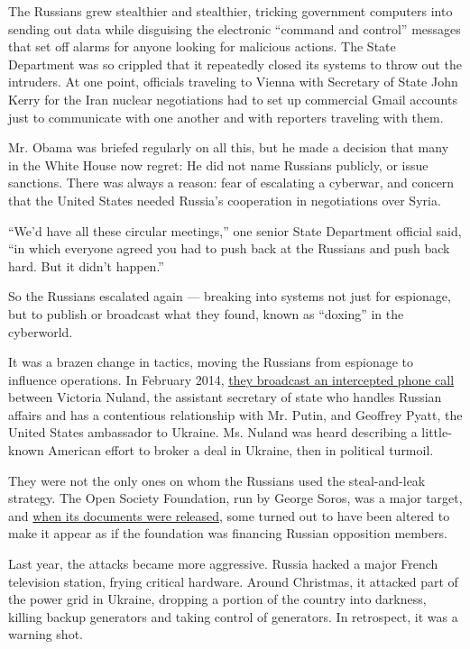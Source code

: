 The Russians grew stealthier and stealthier, tricking government
computers into sending out data while disguising the electronic
``command and control'' messages that set off alarms for anyone looking
for malicious actions. The State Department was so crippled that it
repeatedly closed its systems to throw out the intruders. At one point,
officials traveling to Vienna with Secretary of State John Kerry for the
Iran nuclear negotiations had to set up commercial Gmail accounts just
to communicate with one another and with reporters traveling with them.

Mr. Obama was briefed regularly on all this, but he made a decision that
many in the White House now regret: He did not name Russians publicly,
or issue sanctions. There was always a reason: fear of escalating a
cyberwar, and concern that the United States needed Russia's cooperation
in negotiations over Syria.

``We'd have all these circular meetings,'' one senior State Department
official said, ``in which everyone agreed you had to push back at the
Russians and push back hard. But it didn't happen.''

So the Russians escalated again --- breaking into systems not just for
espionage, but to publish or broadcast what they found, known as
``doxing'' in the cyberworld.

It was a brazen change in tactics, moving the Russians from espionage to
influence operations. In February 2014,
\href{https://www.nytimes.com/2014/02/08/world/europe/ukraine.html}{they
broadcast an intercepted phone call} between Victoria Nuland, the
assistant secretary of state who handles Russian affairs and has a
contentious relationship with Mr. Putin, and Geoffrey Pyatt, the United
States ambassador to Ukraine. Ms. Nuland was heard describing a
little-known American effort to broker a deal in Ukraine, then in
political turmoil.

They were not the only ones on whom the Russians used the steal-and-leak
strategy. The Open Society Foundation, run by George Soros, was a major
target, and \href{http://soros.dcleaks.com/}{when its documents were
released}, some turned out to have been altered to make it appear as if
the foundation was financing Russian opposition members.

Last year, the attacks became more aggressive. Russia hacked a major
French television station, frying critical hardware. Around Christmas,
it attacked part of the power grid in Ukraine, dropping a portion of the
country into darkness, killing backup generators and taking control of
generators. In retrospect, it was a warning shot.


